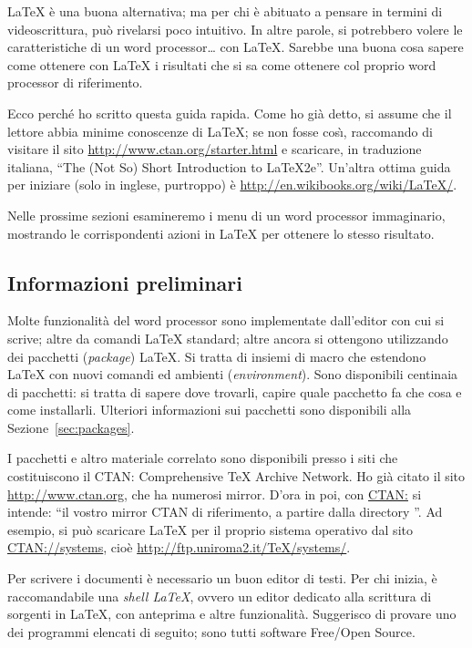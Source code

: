 \documentclass[a4paper,11pt]{article}
\begin{document}
\LaTeX{} \`e una buona alternativa; ma per chi \`e abituato a pensare
in termini di videoscrittura, pu\`o rivelarsi poco intuitivo. In altre
parole, si potrebbero volere le caratteristiche di un word
processor{\ldots} con \LaTeX. Sarebbe una buona cosa sapere come
ottenere con \LaTeX{} i risultati che si sa come ottenere col proprio
word processor di riferimento.

Ecco perch\'e ho scritto questa guida rapida. Come ho gi\`a detto, si
assume che il lettore abbia minime conoscenze di \LaTeX; se non fosse
cos\`\i{}, raccomando di visitare il sito
\url{http://www.ctan.org/starter.html} e scaricare, in traduzione
italiana, ``The (Not So) Short Introduction to \LaTeX2e''. Un'altra
ottima guida per iniziare (solo in inglese, purtroppo) \`e
\url{http://en.wikibooks.org/wiki/LaTeX/}.

Nelle prossime sezioni esamineremo i menu di un word processor
immaginario, mostrando le corrispondenti azioni in \LaTeX{} per
ottenere lo stesso risultato.


\subsection{Informazioni preliminari}

Molte funzionalit\`a del word processor sono implementate dall'editor
con cui si scrive; altre da comandi \LaTeX{} standard; altre ancora si
ottengono utilizzando dei pacchetti (\emph{package}) \LaTeX. Si tratta
di insiemi di macro che estendono \LaTeX{} con nuovi comandi ed
ambienti (\emph{environment}). Sono disponibili centinaia di
pacchetti: si tratta di sapere dove trovarli, capire quale pacchetto
fa che cosa e come installarli. Ulteriori informazioni sui pacchetti
sono disponibili alla Sezione~\ref{sec:packages}.

I pacchetti e altro materiale correlato sono disponibili presso i siti
che costituiscono il CTAN: Comprehensive TeX Archive Network. Ho gi\`a
citato il sito \url{http://www.ctan.org}, che ha numerosi mirror.
D'ora in poi, con \href{http://www.ctan.org}{CTAN:} si intende: ``il
vostro mirror CTAN di riferimento, a partire dalla directory
''. Ad esempio, si pu\`o scaricare \LaTeX{} per il proprio
sistema operativo dal sito
\href{http://ftp.uniroma2.it/TeX/systems/}{CTAN://systems}, cio\`e
\url{http://ftp.uniroma2.it/TeX/systems/}.

Per scrivere i documenti \`e necessario un buon editor di testi. Per
chi inizia, \`e raccomandabile una \emph{shell \LaTeX}, ovvero un
editor dedicato alla scrittura di sorgenti in \LaTeX, con anteprima e
altre funzionalit\`a. Suggerisco di provare uno dei programmi elencati
di seguito; sono tutti software Free/O\-pen Source.
\end{document}
